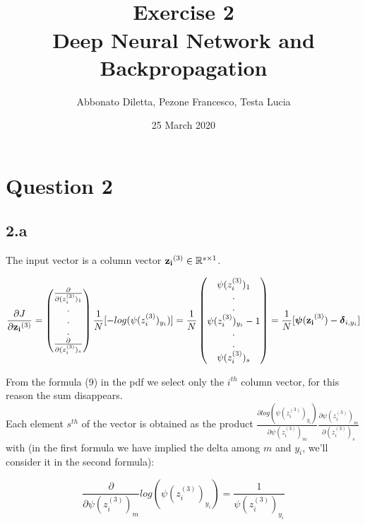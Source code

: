 \documentclass{article}
\title{\BIG{Advanced Machine Learning} \\
Exercise 2 \\  Deep Neural Network and Backpropagation}
\author{Abbonato Diletta, Pezone Francesco, Testa Lucia}
\date{25 March 2020}
\DeclareRobustCommand{\vect}[1]{
  \ifcat#1\relax
    \boldsymbol{#1}
  \else
    \mathbf{#1}
  \fi}
\begin{document}
\maketitle






\section*{Question 2}
\subsection*{2.a}
The input vector is a column vector $\vect{z_i}^{(3)}  \in \mathbb{R}^{s \times 1}$.

\begin{equation}
\frac{\partial J}{\partial \vect{z_i}^{(3)}} = \begin{pmatrix}
\frac{\partial }{\partial (z_i^{(3)})_1}\\ 
.\\ 
.\\ 
.\\ 
\frac{\partial }{\partial (z_i^{(3)})_s}
\end{pmatrix} \frac{1}{N}[ -log(\psi(z_i^{(3)})_{y_i})] = 
\frac{1}{N}
\begin{pmatrix}
\psi(z_i^{(3)})_{1}\\ 
.\\ 
.\\ 
\psi(z_i^{(3)})_{y_i} - 1\\ 
.\\ 
.\\ 
\psi(z_i^{(3)})_{s} 

\end{pmatrix} = 
\frac{1}{N}[\vect{\psi}\vect{(z_i}^{(3)}) -  \vect{\delta}_{i,y_i} ]
\end{equation}

From the formula (9) in the pdf we select only the $i^{th}$ column vector, for this reason the sum disappears.\\
Each element $s^{th}$ of the vector is obtained as the product $ \frac{\partial log(\psi(z_i^{(3)})_{y_i})}{\partial \psi(z_i^{(3)})_m}\frac{\partial \psi(z_i^{(3)})_m}{\partial (z_i^{(3)})_s} $ with (in the first formula we have implied the delta among $m$ and $y_i$, we'll consider it in the second formula): 
 
$$
\frac{\partial }{\partial \psi(z_i^{(3)})_m}log(\psi(z_i^{(3)})_{y_i}) = \frac{1}{\psi(z_i^{(3)})_{y_i}} 
$$
\end{document}
